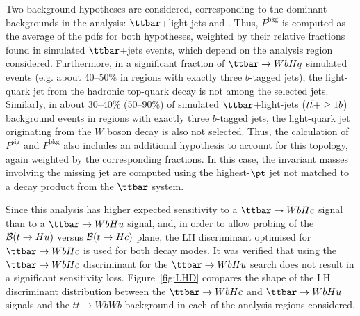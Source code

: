 Two background hypotheses are considered, corresponding to the dominant backgrounds in
the analysis: $\ttbar$+light-jets and \ttbin. Thus, $P^\textrm{bkg}$ is computed as the average of
the pdfs for both hypotheses, weighted by their relative fractions found in simulated $\ttbar$+jets events, which depend
on the analysis region considered. Furthermore, in a significant fraction of $\Hq$ simulated events (e.g. about 40--50\% in regions with exactly three $b$-tagged jets), 
the light-quark jet from the hadronic top-quark decay is not among the selected jets.
Similarly, in about 30--40\% (50--90\%) of simulated $\ttbar$+light-jets ($t\bar{t}+\geq1b$) background events in regions with exactly three $b$-tagged jets, 
the light-quark jet originating from the $W$ boson decay is also not selected. Thus, the calculation of $P^\textrm{sig}$ and
$P^\textrm{bkg}$ also includes an additional hypothesis to account for this topology, again weighted by the corresponding fractions. 
In this case, the invariant masses involving the missing jet are computed using the highest-$\pt$ jet not matched 
to a decay product from the $\ttbar$ system.


Since this analysis has higher expected sensitivity to a $\Hc$ signal than to a $\Hu$ signal, and, in order to allow probing 
of the $\mathcal{B}(t\to Hu)$ versus $\mathcal{B}(t\to Hc)$ plane, the LH discriminant optimised for $\Hc$ is used for both 
decay modes. It was verified that using the $\Hc$ discriminant for the $\Hu$ search does not result in a significant sensitivity loss.
Figure~\ref{fig:LHD} compares the shape of the LH discriminant distribution between the $\Hc$ and $\Hu$ signals and the 
$t\bar{t}\to WbWb$ background in each of the analysis regions considered.


